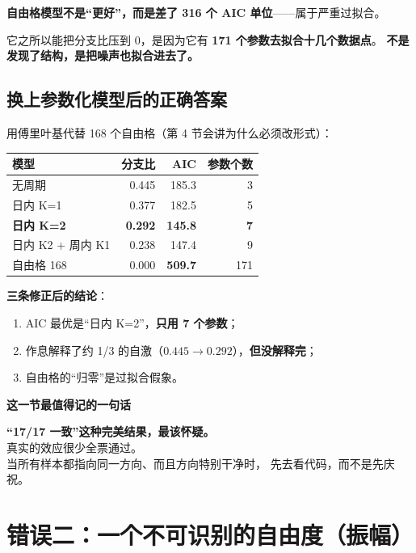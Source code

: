 \documentclass[UTF8,a4paper,11pt]{ctexart}
\newenvironment{explainbox}[1]
{\begin{center}\begin{minipage}{0.94\textwidth}\colorbox{boxbg}{\parbox{0.92\textwidth}{\textbf{#1}\par\vspace{2pt}}}}
{\end{minipage}\end{center}}
\begin{document}
\textbf{自由格模型不是“更好”，而是差了 316 个 AIC 单位}——属于严重过拟合。

它之所以能把分支比压到 0，是因为它有 \textbf{171 个参数去拟合十几个数据点}。
\textbf{不是发现了结构，是把噪声也拟合进去了。}

\subsection{换上参数化模型后的正确答案}

用傅里叶基代替 168 个自由格（第 4 节会讲为什么必须改形式）：

\begin{center}
\begin{tabular}{p{4.4cm}rrr}
\toprule
\textbf{模型} & \textbf{分支比} & \textbf{AIC} & \textbf{参数个数} \\
\midrule
无周期 & 0.445 & 185.3 & 3 \\
日内 K=1 & 0.377 & 182.5 & 5 \\
\textbf{日内 K=2} & \textbf{0.292} & \textbf{145.8} & \textbf{7} \\
日内 K2 + 周内 K1 & 0.238 & 147.4 & 9 \\
自由格 168 & 0.000 & \textbf{509.7} & 171 \\
\bottomrule
\end{tabular}
\end{center}

\textbf{三条修正后的结论}：

\begin{enumerate}[leftmargin=1.8em]
\item AIC 最优是“日内 K=2”，\textbf{只用 7 个参数}；
\item 作息解释了约 1/3 的自激（$0.445 \to 0.292$），\textbf{但没解释完}；
\item 自由格的“归零”是过拟合假象。
\end{enumerate}

\begin{explainbox}{这一节最值得记的一句话}
\textbf{“17/17 一致”这种完美结果，最该怀疑。}\\
真实的效应很少全票通过。\\
当所有样本都指向同一方向、而且方向特别干净时，
先去看代码，而不是先庆祝。
\end{explainbox}

\newpage


\section{错误二：一个不可识别的自由度（振幅）}
\end{document}
